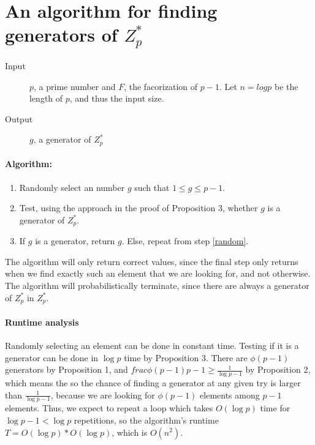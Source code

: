 \documentclass{article}
\newcommand{\z}[1]{Z^*_{#1}}
\begin{document}

\section{An algorithm for finding generators of $\z p$}

\begin{description}
\item[Input] $p$, a prime number and $F$, the facorization of $p-1$. Let $n =
  log p$ be the length of $p$, and thus the input size.
  \item[Output] $g$, a generator of $\z p$
\end{description}

\paragraph{Algorithm:}
\begin{enumerate}
  \item\label{random} Randomly select an number $g$ such that $1 \leq g \leq p - 1$.
   \item Test, using the approach in the proof of Proposition 3, whether $g$ is
     a generator of $\z p$.
   \item If $g$ is a generator, return $g$. Else, repeat from step \ref{random}.
\end{enumerate}

The algorithm will only return correct values, since the final step only returns
when we find exactly such an element that we are looking for, and not otherwise.
The algorithm will probabilistically terminate, since there are always a
generator of $\z p$ in $\z p$.

\paragraph{Runtime analysis}

Randomly selecting an element can be done in constant time. Testing if it is a
generator can be done in $\log p$ time by Proposition 3. There are $\phi(p-1)$
generators by Proposition 1, and $frac{\phi(p-1)}{p-1} \geq \frac{1}{\log p-1}$
by Proposition 2, which means the so the chance of finding a generator at any given
try is larger than $\frac{1}{\log p-1}$, because we are looking for $\phi(p-1)$
elements among $p-1$ elements. Thus, we expect to repeat a loop which takes
$O(\log p)$ time for $\log p - 1 < \log p$ repetitions, so the algorithm's
runtime $T = O(\log p) * O(\log p)$, which is $O(n^2)$.

  
\end{document}
